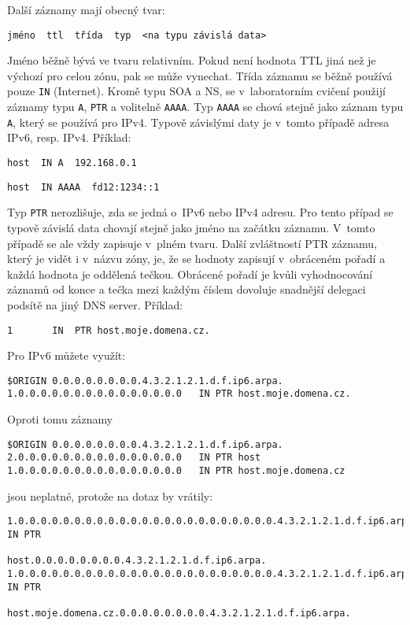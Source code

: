 Další záznamy mají obecný tvar:
\begin{verbatim}
jméno  ttl  třída  typ  <na typu závislá data>
\end{verbatim}
Jméno běžně bývá ve tvaru relativním. Pokud není hodnota TTL jiná než je výchozí pro celou zónu, pak se může vynechat. Třída záznamu se běžně používá pouze {\tt IN} (Internet). Kromě typu SOA a NS, se v~laboratorním cvičení použijí záznamy typu {\tt A}, {\tt PTR} a volitelně {\tt AAAA}. Typ {\tt AAAA} se chová stejně jako záznam typu {\tt A}, který se používá pro IPv4. Typově závislými daty je v~tomto případě adresa IPv6, resp. IPv4. Příklad:
\begin{verbatim}
host  IN A  192.168.0.1
\end{verbatim}
\begin{verbatim}
host  IN AAAA  fd12:1234::1
\end{verbatim}
Typ {\tt PTR} nerozlišuje, zda se jedná o~IPv6 nebo IPv4 adresu. Pro tento případ se typově závislá data chovají stejně jako jméno na začátku záznamu. V~tomto případě se ale vždy zapisuje v~plném tvaru. Další zvláštností PTR záznamu, který je vidět i v~názvu zóny, je, že se hodnoty zapisují v~obráceném pořadí a každá hodnota je oddělená tečkou. Obrácené pořadí je kvůli vyhodnocování záznamů od konce a tečka mezi každým číslem dovoluje snadnější delegaci podsítě na jiný DNS server. Příklad:
\begin{verbatim}
1		IN	PTR	host.moje.domena.cz.
\end{verbatim}

Pro IPv6 můžete využít:
\begin{verbatim}
$ORIGIN 0.0.0.0.0.0.0.0.4.3.2.1.2.1.d.f.ip6.arpa.
1.0.0.0.0.0.0.0.0.0.0.0.0.0.0.0   IN PTR host.moje.domena.cz.
\end{verbatim}
Oproti tomu záznamy
\begin{verbatim}
$ORIGIN 0.0.0.0.0.0.0.0.4.3.2.1.2.1.d.f.ip6.arpa.
2.0.0.0.0.0.0.0.0.0.0.0.0.0.0.0   IN PTR host
1.0.0.0.0.0.0.0.0.0.0.0.0.0.0.0   IN PTR host.moje.domena.cz
\end{verbatim}
jsou neplatné, protože na dotaz by vrátily:
{\small
\begin{verbatim}
1.0.0.0.0.0.0.0.0.0.0.0.0.0.0.0.0.0.0.0.0.0.0.0.4.3.2.1.2.1.d.f.ip6.arpa. IN PTR
                                              host.0.0.0.0.0.0.0.0.4.3.2.1.2.1.d.f.ip6.arpa.
1.0.0.0.0.0.0.0.0.0.0.0.0.0.0.0.0.0.0.0.0.0.0.0.4.3.2.1.2.1.d.f.ip6.arpa. IN PTR
                               host.moje.domena.cz.0.0.0.0.0.0.0.0.4.3.2.1.2.1.d.f.ip6.arpa.
\end{verbatim}}

